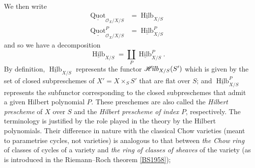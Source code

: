   We then write
  \[     \begin {aligned}       \underline {\operatorname {Quot}}_{\mathcal {O}_X/X/S}       &= \underline {\operatorname {Hilb}}_{X/S}     \\\underline {\operatorname {Quot}}_{\mathcal {O}_X/X/S}^P       &= \underline {\operatorname {Hilb}}_{X/S}^P     \end {aligned}   \]
  and so we have a decomposition
  \[     \underline {\operatorname {Hilb}}_{X/S}     = \coprod _P \underline {\operatorname {Hilb}}_{X/S}^P.   \]
  By definition, \(\underline {\operatorname {Hilb}}_{X/S}\) represents the functor \(\mathscr {H}\kern  -1.75pt\mathit {ilb}_{X/S} (S')\) which is given by the set of closed subpreschemes of \(X'=X\times _S S'\) that are flat over \(S\);
  and \(\underline {\operatorname {Hilb}}_{X/S}^P\) represents the subfunctor corresponding to the closed subpreschemes that admit a given Hilbert polynomial \(P\).
  These preschemes are also called the \emph{Hilbert prescheme} of \(X\) over \(S\) and the \emph{Hilbert prescheme of index \(P\)}, respectively.
  The terminology is justified by the role played in the theory by the Hilbert polynomials.
  Their difference in nature with the classical Chow varieties (meant to parametrise cycles, not varieties) is analogous to that between \emph{the Chow ring} of classes of cycles of a variety and \emph{the ring of classes of sheaves} of the variety (as is introduced in the Riemann–Roch theorem \hyperref[BS1958]{[BS1958]});
  

